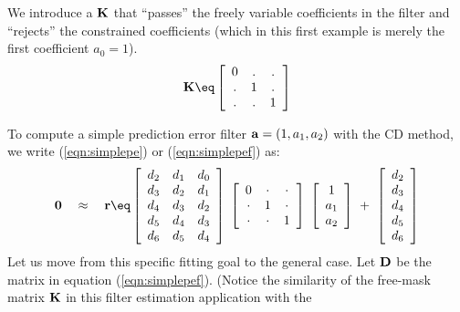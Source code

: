 \par
We introduce a
 $\bold K$
that ``passes'' the freely variable coefficients in the filter
and ``rejects'' the constrained coefficients
(which in this first example is merely the first coefficient $a_0=1$).
\begin{equation}
\bold K \eq
\left[
\begin{array}{cccccc}
  0   & .   & .    \\
  .   & 1   & .    \\
  .   & .   & 1    
  \end{array} \right]
\label{eqn:pefconstraint}
\end{equation}
\par
To compute a simple prediction error filter $\bold a =(1, a_1, a_2)$
with the CD method,
we write
(\ref{eqn:simplepe}) or
(\ref{eqn:simplepef}) as:
\begin{equation}
\bold 0
\quad \approx \quad
\bold r \eq
\left[ 
\begin{array}{ccc}
  d_2 & d_1 & d_0 \\
  d_3 & d_2 & d_1  \\
  d_4 & d_3 & d_2  \\
  d_5 & d_4 & d_3  \\
  d_6 & d_5 & d_4  \end{array} \right] 
\;
\left[ 
\begin{array}{ccc}
    0   & \cdot & \cdot \\
  \cdot &   1   & \cdot \\
  \cdot & \cdot &   1   
  \end{array} \right] 
\;
\left[ 
\begin{array}{c}
  1 \\ 
  a_1 \\ 
  a_2 \end{array} \right]
  \ +\ 
\left[ 
\begin{array}{c}
  d_2 \\ 
  d_3 \\ 
  d_4 \\ 
  d_5 \\ 
  d_6 \end{array} \right] 
  \label{eqn:stdpef}
\end{equation}
Let us move from this specific fitting goal to the general case.
Let $\bold D$ be the matrix in equation (\ref{eqn:simplepef}).
(Notice the similarity of the free-mask matrix $\bold K$
in this filter estimation application with the
